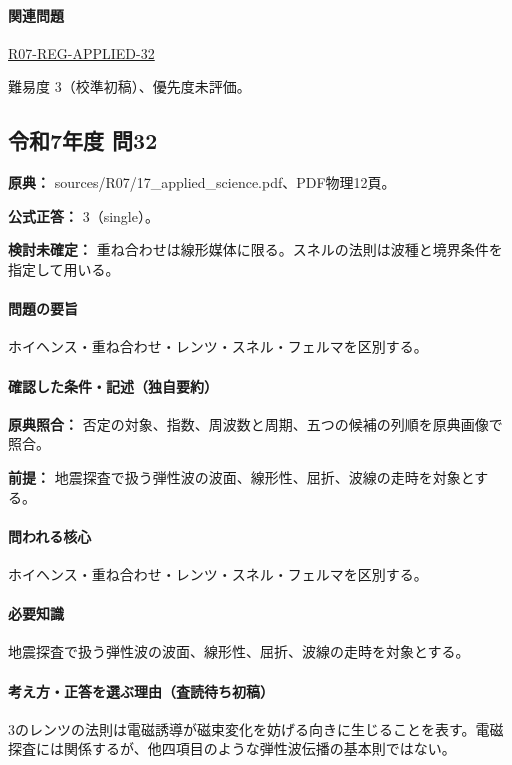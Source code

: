 \paragraph{関連問題} \hyperref[q:r07-reg-applied-32]{R07-REG-APPLIED-32}

\par 難易度 3（校準初稿）、優先度未評価。

\subsection{令和7年度 問32}
\label{q:r07-reg-applied-32}

\noindent\textbf{原典：} sources/R07/17\_applied\_science.pdf、PDF物理12頁。

\textbf{公式正答：} 3（single）。

\par\textbf{検討未確定：} 重ね合わせは線形媒体に限る。スネルの法則は波種と境界条件を指定して用いる。

\paragraph{問題の要旨} ホイヘンス・重ね合わせ・レンツ・スネル・フェルマを区別する。

\paragraph{確認した条件・記述（独自要約）}\mbox{}\par

\noindent\textbf{原典照合：} 否定の対象、指数、周波数と周期、五つの候補の列順を原典画像で照合。\par

\noindent\textbf{前提：} 地震探査で扱う弾性波の波面、線形性、屈折、波線の走時を対象とする。\par

\paragraph{問われる核心} ホイヘンス・重ね合わせ・レンツ・スネル・フェルマを区別する。

\paragraph{必要知識} 地震探査で扱う弾性波の波面、線形性、屈折、波線の走時を対象とする。

\paragraph{考え方・正答を選ぶ理由（査読待ち初稿）} 3のレンツの法則は電磁誘導が磁束変化を妨げる向きに生じることを表す。電磁探査には関係するが、他四項目のような弾性波伝播の基本則ではない。

